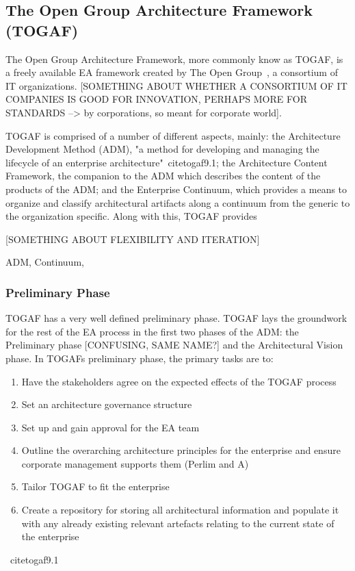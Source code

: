 
\subsection{The Open Group Architecture Framework (TOGAF)}
The Open Group Architecture Framework, more commonly know as TOGAF, is a freely available EA framework created by The Open Group~\cite{togaf9.1}, a consortium of IT organizations. [SOMETHING ABOUT WHETHER A CONSORTIUM OF IT COMPANIES IS GOOD FOR INNOVATION, PERHAPS MORE FOR STANDARDS --> by corporations, so meant for corporate world]. 

TOGAF is comprised of a number of different aspects, mainly: the Architecture Development Method (ADM), "a method for developing and managing the lifecycle of an enterprise
architecture"~cite{togaf9.1}; the Architecture Content Framework, the companion to the ADM which describes the content of the products of the ADM; and the Enterprise Continuum, which provides a means to organize and classify architectural artifacts along a continuum from the generic to the organization specific. Along with this, TOGAF provides 

[SOMETHING ABOUT FLEXIBILITY AND ITERATION]

ADM, Continuum,  \cite{lankhorst2009}

\subsubsection{Preliminary Phase}
TOGAF has a very well defined preliminary phase. TOGAF lays the groundwork for the rest of the EA process in the first two phases of the ADM: the Preliminary phase [CONFUSING, SAME NAME?] and the Architectural Vision phase. In TOGAFs preliminary phase, the primary tasks are to:
\begin{enumerate}
\item Have the stakeholders agree on the expected effects of the TOGAF process
\item Set an architecture governance structure
\item Set up and gain approval for the EA team 
\item Outline the overarching architecture principles for the enterprise and ensure corporate management supports them (Perlim and A)
\item Tailor TOGAF to fit the enterprise
\item Create a repository for storing all architectural information and populate it with any already existing relevant artefacts relating to the current state of the enterprise
\end{enumerate}
~cite{togaf9.1}

